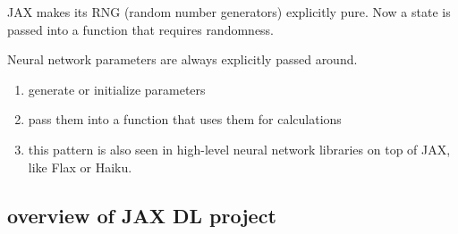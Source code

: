 \documentclass[en,hazy,screen,blue,14pt]{elegantnote}
\begin{document}
\begin{remark}
    JAX makes its RNG (random number generators) explicitly pure. 
    Now a state is passed into a function that requires randomness.
\end{remark}

\begin{remark}
    Neural network parameters are always explicitly passed around.
    \begin{enumerate}
        \item generate or initialize parameters
        \item pass them into a function that uses them for calculations
        \item this pattern is also seen in high-level neural network libraries on top of JAX, like Flax or Haiku.
    \end{enumerate}
\end{remark}

\subsection{overview of JAX DL project}
\end{document}
